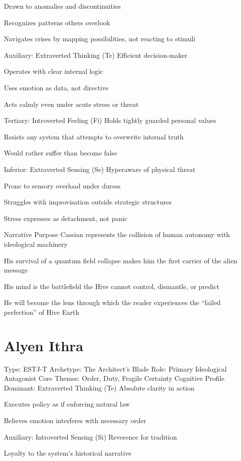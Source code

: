 \documentclass[12pt,oneside]{book}
\begin{document}
Drawn to anomalies and discontinuities


Recognizes patterns others overlook


Navigates crises by mapping possibilities, not reacting to stimuli


Auxiliary: Extraverted Thinking (Te)
Efficient decision-maker


Operates with clear internal logic


Uses emotion as data, not directive


Acts calmly even under acute stress or threat


Tertiary: Introverted Feeling (Fi)
Holds tightly guarded personal values


Resists any system that attempts to overwrite internal truth


Would rather suffer than become false


Inferior: Extraverted Sensing (Se)
Hyperaware of physical threat


Prone to sensory overload under duress


Struggles with improvisation outside strategic structures


Stress expresses as detachment, not panic


Narrative Purpose
Cassian represents the collision of human autonomy with ideological machinery


His survival of a quantum field collapse makes him the first carrier of the alien message


His mind is the battlefield the Hive cannot control, dismantle, or predict


He will become the lens through which the reader experiences the “failed perfection” of Hive Earth


\section{Alyen Ithra}

Type: ESTJ-T
 Archetype: The Architect’s Blade
 Role: Primary Ideological Antagonist
 Core Themes: Order, Duty, Fragile Certainty
Cognitive Profile
Dominant: Extraverted Thinking (Te)
Absolute clarity in action


Executes policy as if enforcing natural law


Believes emotion interferes with necessary order


Auxiliary: Introverted Sensing (Si)
Reverence for tradition


Loyalty to the system’s historical narrative
\end{document}
